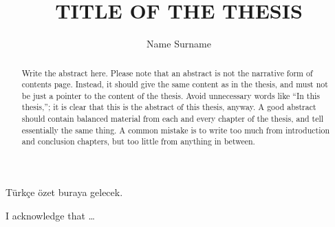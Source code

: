 \documentclass{buthesis}
\title{TITLE OF THE THESIS}
\author{Name Surname}
\begin{document}
\titlepageMS %
\signaturepageMS %

\thispagestyle{plain}
\begin{abstract}
Write the abstract here.  Please note that an abstract is not the narrative form of contents page.
Instead, it should give the same content as in the thesis, and must not be just a pointer to the content of the 
thesis.  Avoid unnecessary words like 
``In this thesis,''; it is clear that this is the abstract of this thesis, anyway.
A good abstract should contain balanced material from each and every chapter of the thesis, and tell essentially the
same  thing.  A common mistake is to write too much from introduction and conclusion chapters, but too little from
anything in between.
\end{abstract}

\begin{ozet}
 T\"urk\c ce \"ozet buraya gelecek. 
\end{ozet}

\begin{ack}
 I acknowledge that \ldots
\end{ack}

\tableofcontents
\listoffigures
\listoftables
\newpage
\newpage
%
\newpage 
\pagestyle{headings}
\makeatother


\setcounter{secnumdepth}{5} %
\setcounter{tocdepth}{4} %


\pagestyle{plain}
\setcounter{page}{1}
\setcounter{section}{1}
\parskip 0.5cm
\parindent 0.5cm





 
 
 



\end{document}
